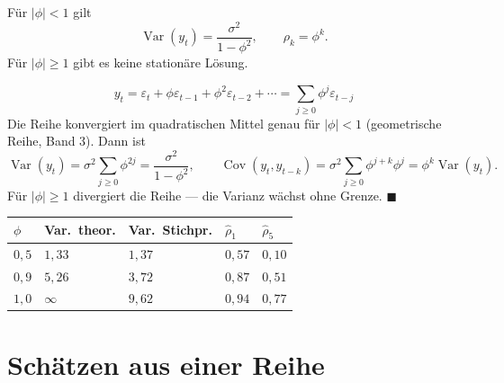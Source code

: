 \begin{merksatz}
Für $|\phi| < 1$ gilt
\[ \operatorname{Var}(y_t) = \frac{\sigma^{2}}{1-\phi^{2}}, \qquad \rho_k = \phi^{k} . \]
Für $|\phi| \ge 1$ gibt es keine stationäre Lösung.

\[ y_t = \varepsilon_t + \phi\varepsilon_{t-1} + \phi^{2}\varepsilon_{t-2} + \cdots = \sum_{j\ge0}\phi^{j}\varepsilon_{t-j} \]
Die Reihe konvergiert im quadratischen Mittel genau für $|\phi|<1$ (geometrische Reihe, Band 3). Dann ist
\[ \operatorname{Var}(y_t) = \sigma^{2}\sum_{j\ge0}\phi^{2j} = \frac{\sigma^{2}}{1-\phi^{2}}, \qquad \operatorname{Cov}(y_t,y_{t-k}) = \sigma^{2}\sum_{j\ge0}\phi^{j+k}\phi^{j} = \phi^{k}\operatorname{Var}(y_t) . \]
Für $|\phi| \ge 1$ divergiert die Reihe --- die Varianz wächst ohne Grenze. $\blacksquare$

\begin{center}
{\small
\renewcommand{\arraystretch}{1.48}
\begin{tabular}{@{}P{1.2cm}P{2.0cm}P{2.0cm}P{1.6cm}P{1.6cm}@{}}
\toprule
$\phi$ & \textbf{Var.\ theor.} & \textbf{Var.\ Stichpr.} & $\hat\rho_1$ & $\hat\rho_5$\\
\midrule
$0{,}5$ & $1{,}33$ & $1{,}37$ & $0{,}57$ & $0{,}10$\\
$0{,}9$ & $5{,}26$ & $3{,}72$ & $0{,}87$ & $0{,}51$\\
$1{,}0$ & $\infty$ & $9{,}62$ & $0{,}94$ & $0{,}77$\\
\bottomrule
\end{tabular}}
\end{center}

\begin{center}
\begin{minipage}{0.88\textwidth}
\end{minipage}
\end{center}
\end{merksatz}

\section{Schätzen aus einer Reihe}

